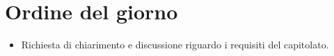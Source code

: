 \section{Ordine del giorno}
\begin{itemize}
\item Richiesta di chiarimento e discussione riguardo i requisiti del capitolato.
\end{itemize}